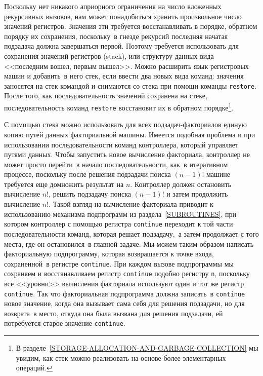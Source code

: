 Поскольку нет никакого априорного ограничения на число вложенных
рекурсивных вызовов, нам может понадобиться хранить произвольное
число значений регистров. Значения эти требуется восстанавливать в
порядке, обратном порядку их сохранения, поскольку~в гнезде рекурсий
последняя начатая подзадача должна завершаться первой.  Поэтому
требуется использовать для сохранения значений регистров 
 (stack), или структуру 
данных вида <<последним вошел, первым вышел>>.  Можно расширить язык
регистровых машин и добавить~в него стек, если ввести два новых вида
команд: значения заносятся на стек командой    и
снимаются со стека при помощи команды  
{\tt restore}.  После 
того, как последовательность значений сохранена на стеке,
последовательность команд {\tt restore} восстановит их в
обратном порядке\footnote{В 
разделе~\ref{STORAGE-ALLOCATION-AND-GARBAGE-COLLECTION} мы увидим,
как стек можно реализовать на основе более элементарных операций.
}.

С помощью стека можно использовать для всех
подзадач-факториалов единую копию путей данных факториальной
машины. Имеется подобная проблема и при использовании
последовательности команд контроллера, который управляет путями
данных.  Чтобы запустить новое вычисление факториала, контроллер не
может просто перейти~в начало последовательности, как~в итеративном
процессе, поскольку после решения подзадачи поиска $(n-1)!$
машине требуется еще домножить результат на $n$.
Контроллер должен остановить вычисление $n!$, решить
подзадачу поиска $(n-1)!$ и затем продолжить вычисление
$n!$.  Такой взгляд на вычисление факториала приводит к
использованию механизма подпрограмм из 
раздела~\ref{SUBROUTINES}, при котором контроллер с помощью
регистра {\tt continue}
переходит к той части
последовательности команд, которая решает подзадачу,~а затем
продолжает с того места, где он остановился~в главной задаче. Мы можем 
таким образом написать факториальную подпрограмму, которая
возвращается к точке входа, сохраненной~в регистре
{\tt continue}.  При каждом вызове подпрограммы мы сохраняем и
восстанавливаем регистр {\tt continue} подобно регистру
{\tt n}, поскольку все <<уровни>> вычисления факториала
используют один и тот же регистр {\tt continue}.  Так что
факториальная подпрограмма должна записать~в {\tt continue}
новое значение, когда она вызывает сама себя для решения подзадачи, но
для возврата~в место, откуда она была вызвана для решения подзадачи,
ей потребуется старое значение {\tt continue}.

